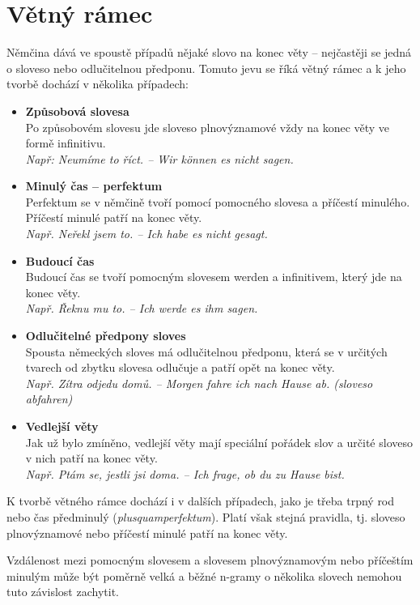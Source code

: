 \documentclass[12pt,a4paper]{report}
\begin{document}
\section{Větný rámec}
Němčina dává ve spoustě případů nějaké slovo na konec věty -- nejčastěji se jedná o sloveso nebo odlučitelnou předponu. Tomuto jevu se říká větný rámec a k jeho tvorbě dochází v několika případech:
\begin{itemize}
\item
\textbf{Způsobová slovesa}\\
Po způsobovém slovesu jde sloveso plnovýznamové vždy na konec věty ve formě infinitivu. \\
\textit{Např: Neumíme to říct. -- Wir können es nicht sagen.}
\item
\textbf{Minulý čas -- perfektum}\\
Perfektum se v němčině tvoří pomocí pomocného slovesa a příčestí minulého. Příčestí minulé patří na konec věty.\\
\textit{Např. Neřekl jsem to. -- Ich habe es nicht gesagt.}
\item
\textbf{Budoucí čas} \\
Budoucí čas se tvoří pomocným slovesem werden a infinitivem, který jde na konec věty.\\
\textit{Např. Řeknu mu to. -- Ich werde es ihm sagen.}
\item
\textbf{Odlučitelné předpony sloves}\\
Spousta německých sloves má odlučitelnou předponu, která se v určitých tvarech od zbytku slovesa odlučuje a patří opět na konec věty.\\
\textit{Např. Zítra odjedu domů. -- Morgen fahre ich nach Hause ab. (sloveso abfahren)}
\item
\textbf{Vedlejší věty}\\
Jak už bylo zmíněno, vedlejší věty mají speciální pořádek slov a určité sloveso v nich patří na konec věty.\\
\textit{Např. Ptám se, jestli jsi doma. -- Ich frage, ob du zu Hause bist.}
\end{itemize}

K tvorbě větného rámce dochází i v dalších případech, jako je třeba trpný rod nebo čas předminulý (\textit{plusquamperfektum}). Platí však stejná pravidla, tj. sloveso plnovýznamové nebo příčestí minulé patří na konec věty.

Vzdálenost mezi pomocným slovesem a slovesem plnovýznamovým nebo příčeštím minulým může být poměrně velká a běžné n-gramy o několika slovech nemohou tuto závislost zachytit.
\end{document}
